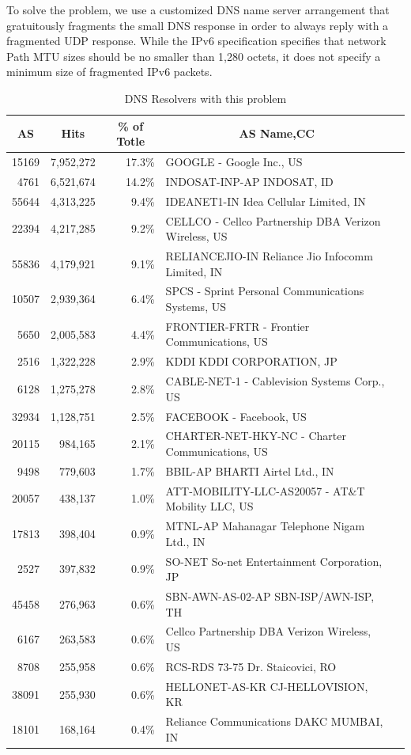 To solve the problem, we use a customized DNS name server arrangement that gratuitously
fragments the small DNS response in order to always reply with a fragmented UDP response.
While the IPv6 specification specifies that network Path MTU sizes should be no smaller than 1,280
octets, it does not specify a minimum size of fragmented IPv6 packets.

\begin{table}[t]
   \caption{DNS Resolvers with this problem}
   \centering
\begin{tabular}{@{}rrrll@{}}
\toprule
\multicolumn{1}{c}{\textbf{AS}} & \multicolumn{1}{c}{\textbf{Hits}} & \multicolumn{1}{c}{\textbf{\% of Totle}} & \multicolumn{1}{c}{\textbf{AS Name,CC}} &  \\ \midrule
15169 & 7,952,272 & 17.3\% & GOOGLE - Google Inc., US &  \\
4761 & 6,521,674 & 14.2\% & INDOSAT-INP-AP INDOSAT, ID &  \\
55644 & 4,313,225 & 9.4\% & IDEANET1-IN Idea Cellular Limited, IN &  \\
22394 & 4,217,285 & 9.2\% & CELLCO - Cellco Partnership DBA Verizon Wireless, US &  \\
55836 & 4,179,921 & 9.1\% & RELIANCEJIO-IN Reliance Jio Infocomm Limited, IN &  \\
10507 & 2,939,364 & 6.4\% & SPCS - Sprint Personal Communications Systems, US &  \\
5650  & 2,005,583 & 4.4\% & FRONTIER-FRTR - Frontier Communications, US &  \\
2516  & 1,322,228 & 2.9\% & KDDI KDDI CORPORATION, JP &  \\
6128  & 1,275,278 & 2.8\% & CABLE-NET-1 - Cablevision Systems Corp., US &  \\
32934 & 1,128,751 & 2.5\% & FACEBOOK - Facebook, US &  \\
20115 & 984,165 & 2.1\% & CHARTER-NET-HKY-NC - Charter Communications, US &  \\
9498  & 779,603 & 1.7\% & BBIL-AP BHARTI Airtel Ltd., IN &  \\
20057 & 438,137 & 1.0\% & ATT-MOBILITY-LLC-AS20057 - AT\&T Mobility LLC, US &  \\
17813 & 398,404 & 0.9\% & MTNL-AP Mahanagar Telephone Nigam Ltd., IN &  \\
2527  & 397,832 & 0.9\% & SO-NET So-net Entertainment Corporation, JP &  \\
45458 & 276,963 & 0.6\% & SBN-AWN-AS-02-AP SBN-ISP/AWN-ISP, TH &  \\
6167  & 263,583 & 0.6\% & Cellco Partnership DBA Verizon Wireless, US &  \\
8708  & 255,958 & 0.6\% & RCS-RDS 73-75 Dr. Staicovici, RO &  \\
38091 & 255,930 & 0.6\% & HELLONET-AS-KR CJ-HELLOVISION, KR &  \\
18101 & 168,164 & 0.4\% & Reliance Communications DAKC MUMBAI, IN &  \\\bottomrule
\end{tabular}
\label{tab:AS_group}
\end{table}


